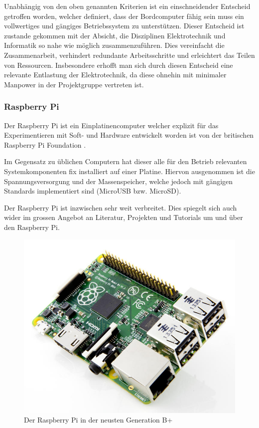Unabhängig von den oben genannten Kriterien ist ein einschneidender
Entscheid getroffen worden, welcher definiert, dass der Bordcomputer
fähig sein muss ein vollwertiges und gängiges Betriebssystem zu 
unterstützen. Dieser Entscheid ist zustande gekommen mit der Absicht, die
Disziplinen Elektrotechnik und Informatik so nahe wie möglich 
zusammenzuführen. Dies vereinfacht die Zusammenarbeit, verhindert 
redundante Arbeitsschritte und erleichtert das Teilen von Ressourcen.
Insbesondere erhofft man sich durch diesen Entscheid eine relevante 
Entlastung der Elektrotechnik, da diese ohnehin mit minimaler Manpower in
der Projektgruppe vertreten ist.

\subsubsection{Raspberry Pi}
\label{ssc_raspberry_pi}
Der Raspberry Pi ist ein Einplatinencomputer welcher explizit für
das Experimentieren mit Soft- und Hardware entwickelt worden ist von
der britischen Raspberry Pi Foundation \cite{RPiFoundation}.

Im Gegensatz zu üblichen Computern hat dieser alle für den Betrieb
relevanten Systemkomponenten fix installiert auf einer Platine. Hiervon
ausgenommen ist die Spannungsversorgung und der Massenspeicher, welche
jedoch mit gängigen Standards implementiert sind (MicroUSB bzw. MicroSD).

Der Raspberry Pi ist inzwischen sehr weit verbreitet. Dies spiegelt sich
auch wider im grossen Angebot an Literatur, Projekten und Tutorials um
und über den Raspberry Pi.

\begin{figure}[h!]
	\centering
	\includegraphics[scale=1]{../../fig/raspberry-pi-b-plus.jpg}
	\caption{Der Raspberry Pi in der neusten Generation B+ 
		\protect\cite{cnet}}
\end{figure}

